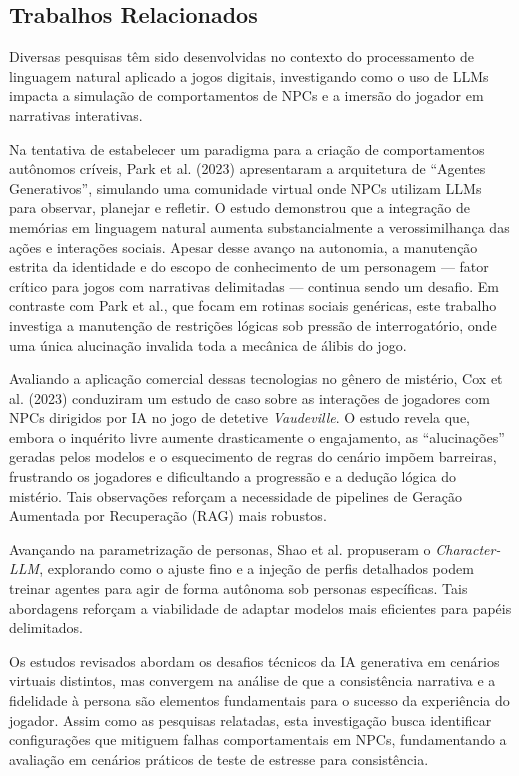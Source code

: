 \documentclass[12pt]{article}
\begin{document}
\subsection{Trabalhos Relacionados}

Diversas pesquisas têm sido desenvolvidas no contexto do processamento de linguagem natural aplicado a jogos digitais, investigando como o uso de LLMs impacta a simulação de comportamentos de NPCs e a imersão do jogador em narrativas interativas.

Na tentativa de estabelecer um paradigma para a criação de comportamentos autônomos críveis, Park et al. (2023) apresentaram a arquitetura de ``Agentes Generativos'', simulando uma comunidade virtual onde NPCs utilizam LLMs para observar, planejar e refletir. O estudo demonstrou que a integração de memórias em linguagem natural aumenta substancialmente a verossimilhança das ações e interações sociais. Apesar desse avanço na autonomia, a manutenção estrita da identidade e do escopo de conhecimento de um personagem — fator crítico para jogos com narrativas delimitadas — continua sendo um desafio. Em contraste com Park et al., que focam em rotinas sociais genéricas, este trabalho investiga a manutenção de restrições lógicas sob pressão de interrogatório, onde uma única alucinação invalida toda a mecânica de álibis do jogo.

Avaliando a aplicação comercial dessas tecnologias no gênero de mistério, Cox et al. (2023) conduziram um estudo de caso sobre as interações de jogadores com NPCs dirigidos por IA no jogo de detetive \textit{Vaudeville}. O estudo revela que, embora o inquérito livre aumente drasticamente o engajamento, as ``alucinações'' geradas pelos modelos e o esquecimento de regras do cenário impõem barreiras, frustrando os jogadores e dificultando a progressão e a dedução lógica do mistério. Tais observações reforçam a necessidade de pipelines de Geração Aumentada por Recuperação (RAG) mais robustos.

Avançando na parametrização de personas, Shao et al. \cite{shao2023character} propuseram o \textit{Character-LLM}, explorando como o ajuste fino e a injeção de perfis detalhados podem treinar agentes para agir de forma autônoma sob personas específicas. Tais abordagens reforçam a viabilidade de adaptar modelos mais eficientes para papéis delimitados.

Os estudos revisados abordam os desafios técnicos da IA generativa em cenários virtuais distintos, mas convergem na análise de que a consistência narrativa e a fidelidade à persona são elementos fundamentais para o sucesso da experiência do jogador. Assim como as pesquisas relatadas, esta investigação busca identificar configurações que mitiguem falhas comportamentais em NPCs, fundamentando a avaliação em cenários práticos de teste de estresse para consistência.
\end{document}

